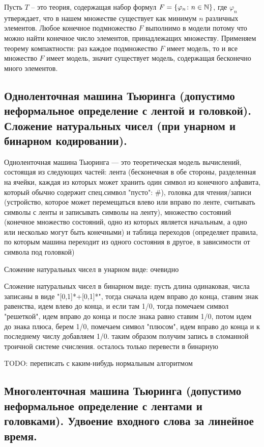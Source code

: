 \documentclass[a4paper, 10pt]{article}
\begin{document}
Пусть $T$ -- это теория, содержащая набор формул $F=\{\varphi_n \colon n \in \mathbb{N}\}$, где $\varphi_n$ утверждает, что в нашем множестве существует как минимум $n$ различных элементов. Любое конечное подмножество $F$ выполнимо в модели потому что можно найти конечное число элементов, принадлежащих множеству. Применяем теорему компактности: раз каждое подмножество $F$ имеет модель, то и все множество $F$ имеет модель, значит существует модель, содержащая бесконечно много элементов.

\subsection{Одноленточная машина Тьюринга (допустимо неформальное определение с лентой и головкой). Сложение натуральных чисел (при унарном и бинарном кодировании).}

Одноленточная машина Тьюринга — это теоретическая модель вычислений, состоящая из следующих частей: лента (бесконечная в обе стороны, разделенная на ячейки, каждая из которых может хранить один символ из конечного алфавита, который обычно содержит спец.символ "пусто": $\#$), головка для чтения/записи (устройство, которое может перемещаться влево или вправо по ленте, считывать символы с ленты и записывать символы на ленту), множество состояний (конечное множество состояний, одно из которых является начальным, а одно или несколько могут быть конечными) и таблица переходов (определяет правила, по которым машина переходит из одного состояния в другое, в зависимости от символа под головкой)

Сложение натуральных чисел в унарном виде: очевидно

Сложение натуральных чисел в бинарном виде: пусть длина одинаковая, числа записаны в виде "[0,1]*+[0,1]*", тогда сначала идем вправо до конца, ставим знак равенства, идем влево до конца, и если там 1/0, тогда помечаем символ "решеткой", идем вправо до конца и после знака равно ставим 1/0, потом идем до знака плюса, берем 1/0, помечаем символ "плюсом", идем вправо до конца и к последнему числу добавляем 1/0. таким образом получим запись в сломанной троичной системе счисления. осталось только перевести в бинарную

TODO: переписать с каким-нибудь нормальным алгоритмом

\subsection{Многоленточная машина Тьюринга (допустимо неформальное определение с лентами и головками). Удвоение входного слова за линейное время.}
\end{document}
